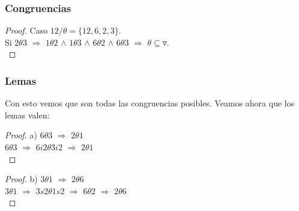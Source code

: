 \documentclass{beamer}
\begin{document}
\begin{frame}
\frametitle{Congruencias}
\begin{proof}
    \noindent Caso $12/\theta=\{12,6,2,3\}$.\\
    Si $2\theta 3$ $\Rightarrow$ $1\theta 2$ $\wedge$ $1\theta 3$ $\wedge$ $6\theta 2$
    $\wedge$ $6\theta 3$ $\Rightarrow$ $\theta \subseteq \triangledown$.\\
\end{proof}
\end{frame}

\begin{frame}
\frametitle{Lemas}


    Con esto vemos que son todas las congruencias posibles. Veamos ahora que los
    lemas valen:\\
\begin{proof}   
    a) $6\theta 3$ $\Rightarrow$ $2\theta 1$\\
       $6\theta 3$ $\Rightarrow$ $6i2\theta 3i2$ $\Rightarrow$ $2\theta 1$\\
\end{proof}
\begin{proof}
    b) $3\theta 1$ $\Rightarrow$ $2\theta 6$\\
       $3\theta 1$ $\Rightarrow$ $3s2\theta 1s2$ $\Rightarrow$ $6\theta 2$ $\Rightarrow$ $2\theta 6$\\
\end{proof}
\end{frame}
\end{document}
